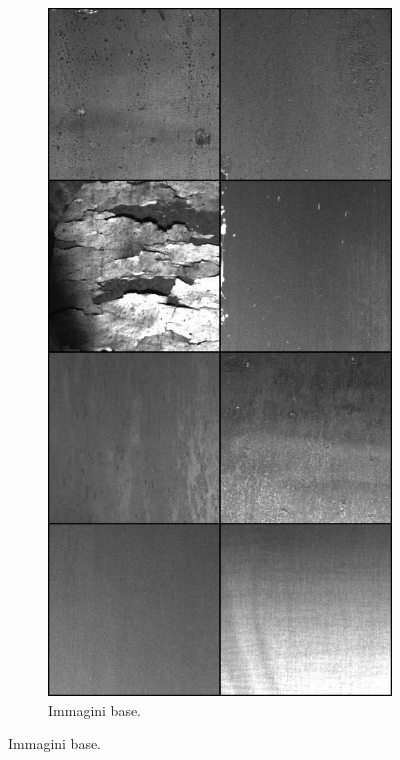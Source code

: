 \begin{figure}[htbp]
\begin{subfigure}[b]{0.3\textwidth}
        \includegraphics[width=\textwidth]{imgs/Coigan/results/artifacts/media_images_base_image_60500_ba90662d90f873ed7e4a.png}
        \caption{Immagini base.}
        \label{fig:artifacts_example_1}
    \end{subfigure}

\end{figure}
